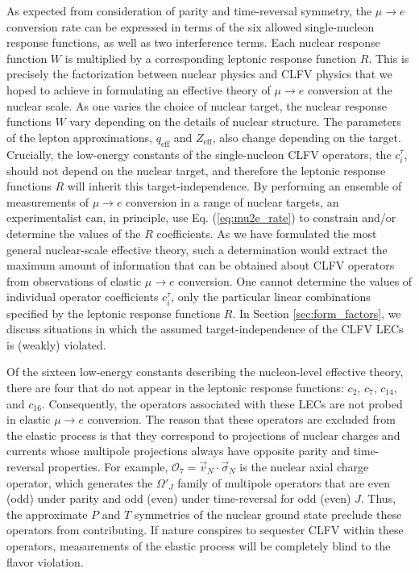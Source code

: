 \documentclass[12pt,letterpaper]{book}
\begin{document}
As expected from consideration of parity and time-reversal symmetry, the $\mu\rightarrow e$ conversion rate can be expressed in terms of the six allowed single-nucleon response functions, as well as two interference terms. Each nuclear response function $W$ is multiplied by a corresponding leptonic response function $R$. This is precisely the factorization between nuclear physics and CLFV physics that we hoped to achieve in formulating an effective theory of $\mu\rightarrow e$ conversion at the nuclear scale. As one varies the choice of nuclear target, the nuclear response functions $W$ vary depending on the details of nuclear structure. The parameters of the lepton approximations, $q_\mathrm{eff}$ and $Z_\mathrm{eff}$, also change depending on the target. Crucially, the low-energy constants of the single-nucleon CLFV operators, the $c_i^{\tau}$, should not depend on the nuclear target, and therefore the leptonic response functions $R$ will inherit this target-independence. By performing an ensemble of measurements of $\mu\rightarrow e$ conversion in a range of nuclear targets, an experimentalist can, in principle, use Eq. (\ref{eq:mu2e_rate}) to constrain and/or determine the values of the $R$ coefficients. As we have formulated the most general nuclear-scale effective theory, such a determination would extract the maximum amount of information that can be obtained about CLFV operators from observations of elastic $\mu\rightarrow e$ conversion. One cannot determine the values of individual operator coefficients $c_i^{\tau}$, only the particular linear combinations specified by the leptonic response functions $R$. In Section \ref{sec:form_factors}, we discuss situations in which the assumed target-independence of the CLFV LECs is (weakly) violated.  

Of the sixteen low-energy constants describing the nucleon-level effective theory, there are four that do not appear in the leptonic response functions: $c_2$, $c_7$, $c_{14}$, and $c_{16}$. Consequently, the operators associated with these LECs are not probed in elastic $\mu\rightarrow e$ conversion. The reason that these operators are excluded from the elastic process is that they correspond to projections of nuclear charges and currents whose multipole projections always have opposite parity and time-reversal properties. For example, $\mathcal{O}_7=\vec{v}_N\cdot\vec{\sigma}_N$ is the nuclear axial charge operator, which generates the $\Omega'_J$ family of multipole operators that are even (odd) under parity and odd (even) under time-reversal for odd (even) $J$. Thus, the approximate $P$ and $T$ symmetries of the nuclear ground state preclude these operators from contributing. If nature conspires to sequester CLFV within these operators, measurements of the elastic process will be completely blind to the flavor violation. 
\end{document}
